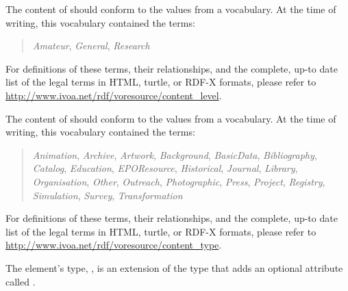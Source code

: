 \documentclass[11pt,a4paper]{ivoa}
\begin{document}
The content of  should conform to the values from a
vocabulary.  At the time of writing, this vocabulary contained the
terms:

\begin{quotation}\noindent
\textsl{Amateur},
\textsl{General},
\textsl{Research}
\end{quotation}

For definitions of these terms, their relationships, and the complete,
up-to date list of the legal terms in HTML, turtle, or RDF-X formats,
please refer to \url{http://www.ivoa.net/rdf/voresource/content_level}.

The content of  should conform to the values from a
vocabulary.  At the time of writing, this vocabulary contained the
terms:

\begin{quotation}\noindent
\raggedright
\textsl{Animation},
\textsl{Archive},
\textsl{Artwork},
\textsl{Background},
\textsl{BasicData},
\textsl{Bibliography},
\textsl{Catalog},
\textsl{Education},
\textsl{EPOResource},
\textsl{Historical},
\textsl{Journal},
\textsl{Library},
\textsl{Organisation},
\textsl{Other},
\textsl{Outreach},
\textsl{Photographic},
\textsl{Press},
\textsl{Project},
\textsl{Registry},
\textsl{Simulation},
\textsl{Survey},
\textsl{Transformation}
\end{quotation}

For definitions of these terms, their relationships, and the complete,
up-to date list of the legal terms in HTML, turtle, or RDF-X formats,
please refer to \url{http://www.ivoa.net/rdf/voresource/content_type}.


The  element's type,
, is an extension of the
 type that adds an optional attribute called
.
\end{document}
